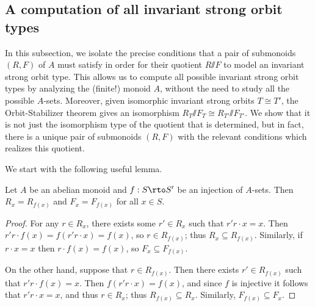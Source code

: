 \documentclass[11pt]{amsart}
\renewcommand{\ss}{\mathord{\sslash}}
\begin{document}
\subsection{A computation of all invariant strong orbit types} 
In this subsection, we isolate the precise conditions that a pair of submonoids $(R,F)$ of $A$ must satisfy in order for their quotient $R\ss F$ to model an invariant strong orbit type. This allows us to compute all possible invariant strong orbit types by analyzing the (finite!) monoid $A$, without the need to study all the possible $A$-sets. Moreover, given isomorphic invariant strong orbits $T\cong T'$, the Orbit-Stabilizer theorem gives an isomorphism $R_T\ss F_T\cong R_{T'}\ss F_{T'}$. We show that it is not just the isomorphism type of the quotient that is determined, but in fact, there is a unique pair of submonoids $(R,F)$ with the relevant conditions which realizes this quotient.

We start with the following useful lemma.

\begin{lemma} \label{lem:ambittopair}
  Let $A$ be an abelian monoid and $f:S \rto S'$ be an injection of $A$-sets.  Then $R_x = R_{f(x)}$ and $F_x = F_{f(x)}$ for all $x\in S$.  %
\end{lemma}

\begin{proof}
    For any $r\in R_x$, there exists some $r'\in R_x$ such that $r'r\cdot x = x$.  Then $r'r \cdot f(x) = f(r'r\cdot x) = f(x)$, so $r\in R_{f(x)}$; thus $R_x \subseteq R_{f(x)}$.  Similarly, if $r \cdot x = x$ then $r \cdot f(x) = f(x)$, so $F_x \subseteq F_{f(x)}$.

    On the other hand, suppose that $r\in R_{f(x)}$.  Then there exists $r'\in R_{f(x)}$ such that $r'r \cdot f(x) = x$.  Then $f(r'r\cdot x) = f(x)$, and since $f$ is injective it follows that $r'r \cdot x = x$, and thus $r\in R_{x}$; thus $R_{f(x)} \subseteq R_x$.  Similarly, $F_{f(x)} \subseteq F_x$.  
\end{proof}
\end{document}
